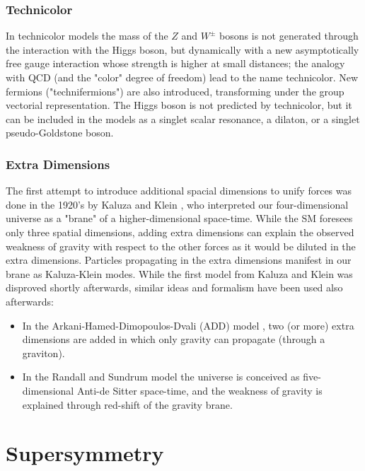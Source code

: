 \subsubsection*{Technicolor}
In technicolor models \cite{Weinberg:1975gm}\cite{PhysRevD.20.2619} the mass of the $Z$ and $W^{\pm}$ bosons is not generated through the interaction with the Higgs boson, but dynamically with a new asymptotically free gauge interaction whose strength is higher at small distances; the analogy with QCD (and the "color" degree of freedom) lead to the name technicolor. New fermions ("technifermions") are also introduced, transforming under the group vectorial representation. The Higgs boson is not predicted by technicolor, but it can be included in the models as a singlet scalar resonance, a dilaton, or a singlet pseudo-Goldstone boson.

\subsubsection*{Extra Dimensions}

The first attempt to introduce additional spacial dimensions to unify forces was done in the 1920's by Kaluza and Klein \cite{Kaluza}\cite{Klein:1926tv}, who interpreted our four-dimensional universe as a "brane" of a higher-dimensional space-time. While the SM foresees only three spatial dimensions, adding extra dimensions can explain the observed weakness of gravity with respect to the other forces as it would be diluted in the extra dimensions. 
Particles propagating in the extra dimensions manifest in our brane as Kaluza-Klein modes. %
While the first model from Kaluza and Klein was disproved shortly afterwards, similar ideas and formalism have been used also afterwards:  

\begin{itemize}
\item In the Arkani-Hamed-Dimopoulos-Dvali (ADD) model \cite{ArkaniHamed:1998rs}, two (or more) extra dimensions are added in which only gravity can propagate (through a graviton).
\item In the Randall and Sundrum model \cite{PhysRevLett.83.3370} the universe is conceived as five-dimensional Anti-de Sitter space-time, and the weakness of gravity is explained through red-shift of the gravity brane.
\end{itemize}


\section{Supersymmetry}
\label{sec:smsusy:susy}

